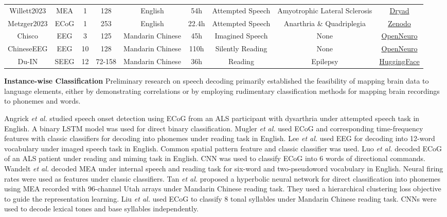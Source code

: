 \documentclass[journal]{IEEEtran}
\begin{document}
\begin{table*}[htpb]
{\begin{tabular}{c|c|c|c|c|c|c|c|c}
Willett2023 \cite{Willett2023} & MEA & 1 & 128 & English & 54h & Attempted Speech & Amyotrophic Lateral Sclerosis & \href{https://doi.org/10.5061/dryad.x69p8czpq}{Dryad} \\
Metzger2023 \cite{Metzger2023} & ECoG & 1 & 253 & English & 22.4h & Attempted Speech & Anarthria \& Quadriplegia & \href{https://doi.org/10.5281/zenodo.8200782}{Zenodo} \\
Chisco \cite{Zhang2024b} & EEG & 3 & 125 & Mandarin Chinese & 45h & Imagined Speech & None & \href{https://openneuro.org/datasets/ds005170}{OpenNeuro} \\
ChineseEEG \cite{Mou2024} & EEG & 10 & 128 & Mandarin Chinese & 110h & Silently Reading & None & \href{https://openneuro.org/datasets/ds004952}{OpenNeuro} \\
Du-IN \cite{Zheng2024} & SEEG & 12 & 72-158 & Mandarin Chinese & 36h & Reading & Epilepsy & \href{https://huggingface.co/datasets/liulab-repository/Du-IN}{HuggingFace} \\
\bottomrule
\end{tabular}}
\end{table*}

\textbf{Instance-wise Classification} Preliminary research on speech decoding primarily established the feasibility of mapping brain data to language elements, either by demonstrating correlations \cite{Bouchard2013, Chartier2018, Dichter2018, Leonard2024} or by employing rudimentary classification methods for mapping brain recordings to phonemes and words.

Angrick \emph{et al.} \cite{Angrick2024a} studied speech onset detection using ECoG from an ALS participant with dysarthria under attempted speech task in English. A binary LSTM model was used for direct binary classification. Mugler \emph{et al.} \cite{Mugler2014} used ECoG and corresponding time-frequency features with classic classifiers for decoding into phonemes under reading task in English. Lee \emph{et al.} \cite{Lee2020} used EEG for decoding into 12-word vocabulary under imaged speech task in English. Common spatial pattern feature and classic classifier was used. Luo \emph{et al.} \cite{Luo2023} decoded ECoG of an ALS patient under reading and miming task in English. CNN was used to classify ECoG into 6 words of directional commands. Wandelt \emph{et al.} \cite{Wandelt2024} decoded MEA under internal speech and reading task for six-word and two-pseudoword vocabulary in English. Neural firing rates were used as features under classic classifiers. Tan \emph{et al.} \cite{Tan2024} proposed a hyperbolic neural network for direct classification into phonemes using MEA recorded with 96-channel Utah arrays under Mandarin Chinese reading task. They used a hierarchical clustering loss objective to guide the representation learning. Liu \emph{et al.} \cite{Liu2023a} used ECoG to classify 8 tonal syllables under Mandarin Chinese reading task. CNNs were used to decode lexical tones and base syllables independently.
\end{document}
